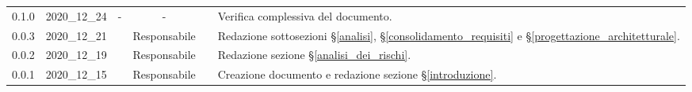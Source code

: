 {\begin{longtable}{c c C{3cm} c c C{3cm}}
    0.1.0 & 2020\_12\_24 & - & - & \PC{} & Verifica complessiva del documento.\\

    0.0.3 & 2020\_12\_21 & \MM{} & Responsabile &  \PC{} &Redazione sottosezioni \S\ref{analisi}, \S\ref{consolidamento_requisiti} e \S\ref{progettazione_architetturale}. \\

    0.0.2 & 2020\_12\_19 & \MM{} & Responsabile &  \PC{} & Redazione sezione \S\ref{analisi_dei_rischi}.\\

    0.0.1 & 2020\_12\_15 & \MM{} & Responsabile &  \PC{} & Creazione documento e redazione sezione \S\ref{introduzione}.
			
\end{longtable}
}